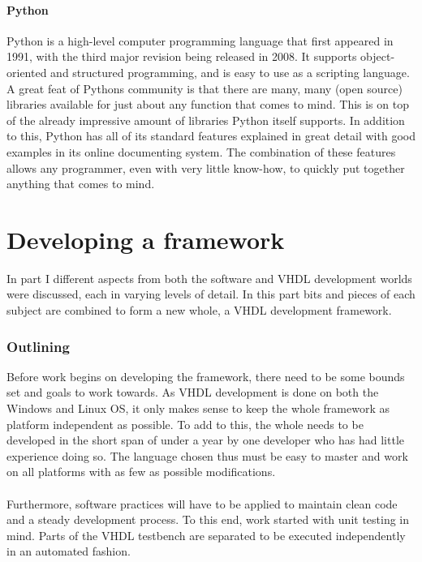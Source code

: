 \documentclass[11pt,british]{article}
\begin{document}
\subsection{Python}
Python is a high-level computer programming language that first appeared in 1991, with the third major revision being released in 2008. It supports object-oriented and structured programming, and is easy to use as a scripting language. A great feat of Pythons community is that there are many, many (open source) libraries available for just about any function that comes to mind. This is on top of the already impressive amount of libraries Python itself supports. In addition to this, Python has all of its standard features explained in great detail with good examples in its online documenting system. The combination of these features allows any programmer, even with very little know-how, to quickly put together anything that comes to mind.


\newpage
\part{Developing a framework}
In part I different aspects from both the software and \gls{VHDL} development worlds were discussed, each in  varying levels of detail. In this part bits and pieces of each subject are combined to form a new whole, a VHDL development framework.

\section{Outlining}
\label{sec:outlining}
Before work begins on developing the framework, there need to be some bounds set and goals to work towards. As VHDL development is done on both the Windows and Linux \gls{OS}, it only makes sense to keep the whole framework as platform independent as possible. To add to this, the whole needs to be developed in the short span of under a year by one developer who has had little experience doing so. The language chosen thus must be easy to master and work on all platforms with as few as possible modifications.\\
\\
Furthermore, software practices will have to be applied to maintain clean code and a steady development process. To this end, work started with unit testing in mind. Parts of the VHDL testbench are separated to be executed independently in an automated fashion.
\end{document}
